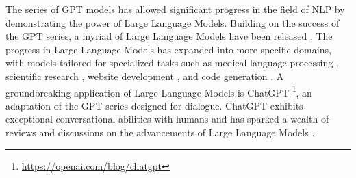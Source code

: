 The series of \ac{GPT} models has allowed significant progress in the field of \ac{NLP} by demonstrating the power of Large Language Models. Building on the success of the \ac{GPT} series, a myriad of Large Language Models have been released \citep{scao2022bloom, chowdhery2022palm, touvron2023llama}. The progress in Large Language Models has expanded into more specific domains, with models tailored for specialized tasks such as medical language processing \citep{thirunavukarasu2023large}, scientific research \citep{wang2023scientific}, website development \citep{wang2023software}, and code generation \citep{xu2022systematic}. A groundbreaking application of Large Language Models is ChatGPT \footnote{\url{https://openai.com/blog/chatgpt}}, an adaptation of the \ac{GPT}-series designed for dialogue. ChatGPT exhibits exceptional conversational abilities with humans and has sparked a wealth of reviews and discussions on the advancements of Large Language Models \citep{zhao2023survey, mohamadi2023chatgpt, hadi2023large}. 

